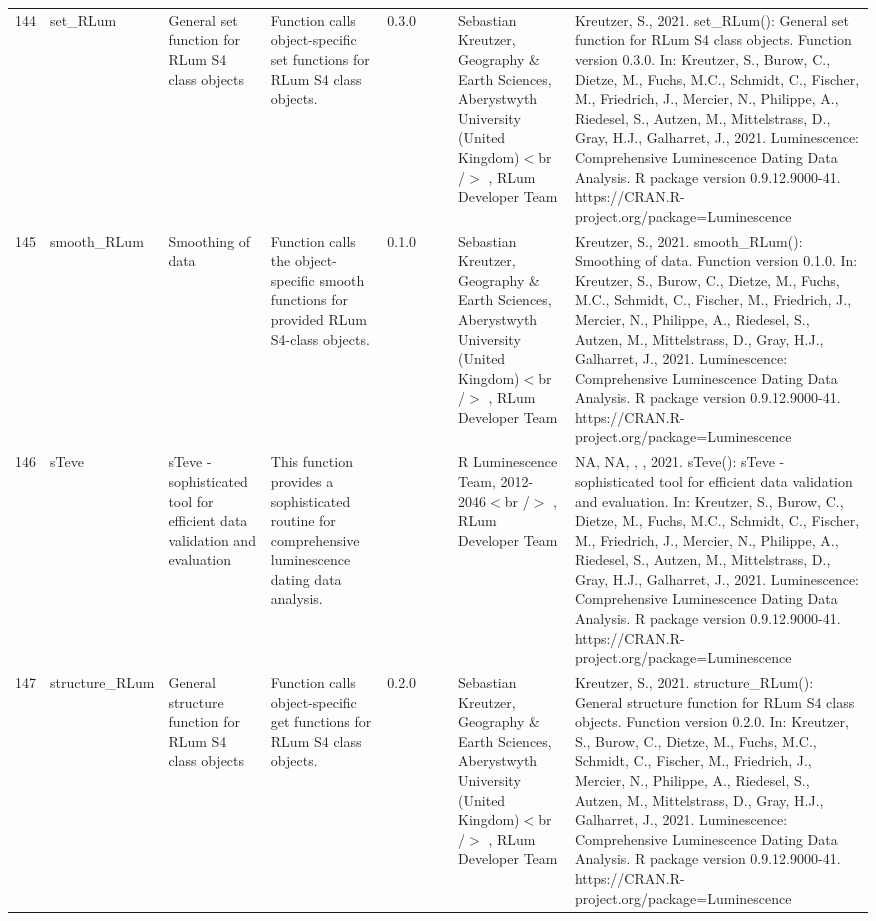 \begin{table}[ht]
\begin{tabular}{rllllllll}
 \\ 
  144 & set\_RLum & General set function for RLum S4 class objects & Function calls object-specific set functions for RLum S4 class objects. & 0.3.0
 &  &  & Sebastian Kreutzer, Geography \& Earth Sciences, Aberystwyth University (United Kingdom)$<$br /$>$ , RLum Developer Team & Kreutzer, S., 2021. set\_RLum(): General set function for RLum S4 class objects. Function version 0.3.0. In: Kreutzer, S., Burow, C., Dietze, M., Fuchs, M.C., Schmidt, C., Fischer, M., Friedrich, J., Mercier, N., Philippe, A., Riedesel, S., Autzen, M., Mittelstrass, D., Gray, H.J., Galharret, J., 2021. Luminescence: Comprehensive Luminescence Dating Data Analysis. R package version 0.9.12.9000-41. https://CRAN.R-project.org/package=Luminescence
 \\ 
  145 & smooth\_RLum & Smoothing of data & Function calls the object-specific smooth functions for provided RLum S4-class objects. & 0.1.0
 &  &  & Sebastian Kreutzer, Geography \& Earth Sciences, Aberystwyth University (United Kingdom)$<$br /$>$ , RLum Developer Team & Kreutzer, S., 2021. smooth\_RLum(): Smoothing of data. Function version 0.1.0. In: Kreutzer, S., Burow, C., Dietze, M., Fuchs, M.C., Schmidt, C., Fischer, M., Friedrich, J., Mercier, N., Philippe, A., Riedesel, S., Autzen, M., Mittelstrass, D., Gray, H.J., Galharret, J., 2021. Luminescence: Comprehensive Luminescence Dating Data Analysis. R package version 0.9.12.9000-41. https://CRAN.R-project.org/package=Luminescence
 \\ 
  146 & sTeve & sTeve - sophisticated tool for efficient data validation and evaluation & This function provides a sophisticated routine for comprehensive luminescence dating data analysis. &  &  &  & R Luminescence Team, 2012-2046$<$br /$>$ , RLum Developer Team & NA, NA, , , 2021. sTeve(): sTeve - sophisticated tool for efficient data validation and evaluation. In: Kreutzer, S., Burow, C., Dietze, M., Fuchs, M.C., Schmidt, C., Fischer, M., Friedrich, J., Mercier, N., Philippe, A., Riedesel, S., Autzen, M., Mittelstrass, D., Gray, H.J., Galharret, J., 2021. Luminescence: Comprehensive Luminescence Dating Data Analysis. R package version 0.9.12.9000-41. https://CRAN.R-project.org/package=Luminescence
 \\ 
  147 & structure\_RLum & General structure function for RLum S4 class objects & Function calls object-specific get functions for RLum S4 class objects. & 0.2.0
 &  &  & Sebastian Kreutzer, Geography \& Earth Sciences, Aberystwyth University (United Kingdom)$<$br /$>$ , RLum Developer Team & Kreutzer, S., 2021. structure\_RLum(): General structure function for RLum S4 class objects. Function version 0.2.0. In: Kreutzer, S., Burow, C., Dietze, M., Fuchs, M.C., Schmidt, C., Fischer, M., Friedrich, J., Mercier, N., Philippe, A., Riedesel, S., Autzen, M., Mittelstrass, D., Gray, H.J., Galharret, J., 2021. Luminescence: Comprehensive Luminescence Dating Data Analysis. R package version 0.9.12.9000-41. https://CRAN.R-project.org/package=Luminescence

\end{tabular}
\end{table}
